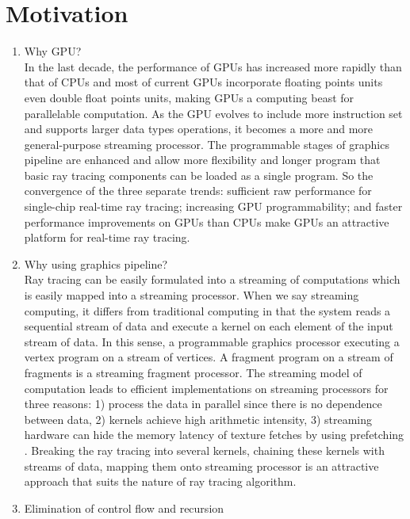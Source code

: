  \section{Motivation}
\begin{enumerate}
    \item Why GPU? \\
    In the last decade, the performance of GPUs has increased more rapidly than that of CPUs and most of current GPUs incorporate floating points units even double float points units, making GPUs a computing beast for parallelable computation. As the GPU evolves to include more instruction set and supports larger data types operations, it becomes a more and more general-purpose streaming processor. The programmable stages of graphics pipeline are enhanced and allow more flexibility and longer program that basic ray tracing components can be loaded as a single program. So the convergence of the three separate trends: sufficient raw performance for single-chip real-time ray tracing; increasing GPU programmability; and faster performance improvements on GPUs than CPUs make GPUs an attractive platform for real-time ray tracing.
    \item Why using graphics pipeline?\\
    Ray tracing can be easily formulated into a streaming of computations which is easily mapped into a streaming processor. When we say streaming computing, it differs from traditional computing in that the system reads a sequential stream of data and execute a kernel on each element of the input stream of data. In this sense, a programmable graphics processor executing a vertex program on a stream of vertices. A fragment program on a stream of fragments is a streaming fragment processor. The streaming model of computation leads to efficient implementations on streaming processors for three reasons: 1) process the data in parallel since there is no dependence between data, 2) kernels achieve high arithmetic intensity, 3) streaming hardware can hide the memory latency of texture fetches by using prefetching \cite{purcell2002ray}. Breaking the ray tracing into several kernels, chaining these kernels with streams of data, mapping them onto streaming processor is an attractive approach that suits the nature of ray tracing algorithm. 
    \item Elimination of control flow and recursion\\

\end{enumerate}
